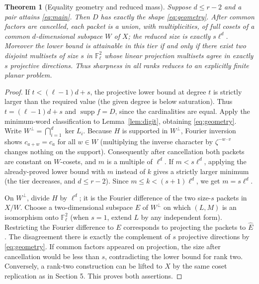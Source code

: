 \documentclass[11pt]{article}
\newtheorem{theorem}{Theorem}[section]
\theoremstyle{remark}\newtheorem{remark}[theorem]{Remark}
\newcommand{\F}{\mathbb F}
\newcommand{\supp}{\operatorname{supp}}
\begin{document}
\begin{theorem}[Equality geometry and reduced mass]\label{thm:rigidity}
Suppose $d\le r-2$ and a pair attains \eqref{eq:main}. Then $D$ has exactly the shape \eqref{eq:geometry}. After common factors are cancelled, each packet is a union, with multiplicities, of full cosets of a common $d$-dimensional subspace $W$ of $X$; the reduced size is exactly $s\ell^d$. Moreover the lower bound is attainable in this tier if and only if there exist two disjoint multisets of size $s$ in $\F_\ell^2$ whose linear projection multisets agree in exactly $s$ projective directions. Thus sharpness in all ranks reduces to an explicitly finite planar problem.
\end{theorem}
\begin{proof}
If $t<(\ell-1)d+s$, the projective lower bound at degree $t$ is strictly larger than the required value (the given degree is below saturation). Thus $t=(\ell-1)d+s$ and $\supp f=D$, since the cardinalities are equal. Apply the minimum-word classification to Lemma~\ref{lem:digit}, obtaining \eqref{eq:geometry}. Write $W^\perp=\bigcap_{i=1}^d\ker L_i$. Because $H$ is supported in $W^\perp$, Fourier inversion shows $c_{a+w}=c_a$ for all $w\in W$ (multiplying the inverse character by $\zeta^{-w\cdot v}$ changes nothing on the support). Consequently after cancellation both packets are constant on $W$-cosets, and $m$ is a multiple of $\ell^d$. If $m<s\ell^d$, applying the already-proved lower bound with $m$ instead of $k$ gives a strictly larger minimum (the tier decreases, and $d\le r-2$). Since $m\le k<(s+1)\ell^d$, we get $m=s\ell^d$.

On $W^\perp$, divide $H$ by $\ell^d$; it is the Fourier difference of the two size-$s$ packets in $X/W$. Choose a two-dimensional subspace $E$ of $W^\perp$ on which $(L,M)$ is an isomorphism onto $\F_\ell^2$ (when $s=1$, extend $L$ by any independent form). Restricting the Fourier difference to $E$ corresponds to projecting the packets to $\widehat E$. The disagreement there is exactly the complement of $s$ projective directions by \eqref{eq:geometry}. If common factors appeared on projection, the size after cancellation would be less than $s$, contradicting the lower bound for rank two. Conversely, a rank-two construction can be lifted to $X$ by the same coset replication as in Section 5. This proves both assertions.
\end{proof}
\end{document}

